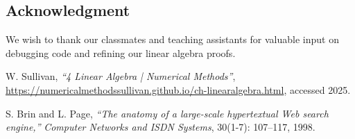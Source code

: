 \documentclass{article}
\begin{document}
\subsection*{Acknowledgment}
We wish to thank our classmates and teaching assistants for valuable input on debugging code and refining 
our linear algebra proofs.

\begin{thebibliography}{9}

W. Sullivan,
\textit{``4 Linear Algebra | Numerical Methods''},
\url{https://numericalmethodssullivan.github.io/ch-linearalgebra.html}, 
accessed 2025.

S. Brin and L. Page,
\textit{``The anatomy of a large-scale hypertextual Web search engine,''}
\emph{Computer Networks and ISDN Systems}, 30(1-7): 107--117, 1998.

\end{thebibliography}
\end{document}
